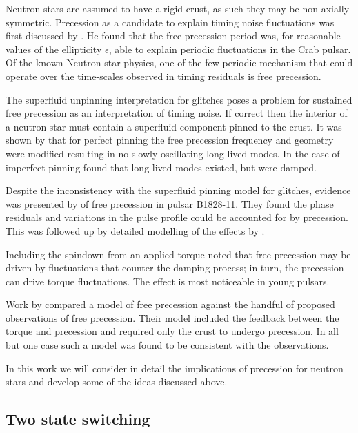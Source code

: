 Neutron stars are assumed to have a rigid crust, as such they may be
non-axially symmetric. Precession as a candidate to explain timing noise
fluctuations was first discussed by \citet{Ruderman1970}. He found that the
free precession period was, for reasonable values of the  ellipticity
$\epsilon$, able to explain periodic fluctuations in the Crab pulsar. Of the
known Neutron star physics, one of the few periodic mechanism that could
operate over the time-scales observed in timing residuals is free precession.

The superfluid unpinning interpretation for glitches poses a problem for
sustained free precession as an interpretation of timing noise. If correct then
the interior of a neutron star must contain a superfluid component pinned to
the crust.
It was shown by \citet{Shaham1977} that for perfect pinning the free precession
frequency and geometry were modified resulting in no slowly oscillating
long-lived modes. In the case of imperfect pinning \citet{Sedrakian1999} found
that long-lived modes existed, but were damped.

Despite the inconsistency with the superfluid pinning model for glitches,
evidence was presented by \citet{Stairs2000} of free precession in pulsar
B1828-11. They found the phase residuals and variations in the pulse profile
could be accounted for by precession. This was followed up by detailed
modelling of the effects by \citet{Akgun2006}.

Including the spindown from an applied torque \citet{Cordes1993} noted that
free precession may be driven by fluctuations that counter the damping process;
in turn, the precession can drive torque fluctuations. The effect is most
noticeable in young pulsars.

Work by \citet{Jones2001} compared a model of free precession against the handful
of proposed observations of free precession. Their model included the feedback
between the torque and precession and required only the crust to undergo precession.
In all but one case such a model was found to be consistent with the observations.

In this work we will consider in detail the implications of precession for
neutron stars and develop some of the ideas discussed above.

\subsection{Two state switching}
\label{sec: two state switching}

